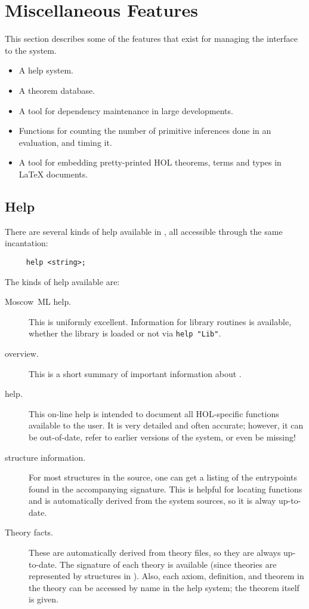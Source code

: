 \chapter{Miscellaneous Features}\label{avramisc}

This section describes some of the features
that exist for managing the interface
%
%
to the \HOL{} system.

\begin{itemize}
\item A help system.
\item A theorem database.
\item A tool for dependency maintenance in large developments.
\item Functions for counting the number of primitive inferences done in
an evaluation, and timing it.
\item A tool for embedding pretty-printed HOL theorems, terms and
  types in \LaTeX{} documents.
\end{itemize}

\section{Help}

 There are several kinds of help available in \HOL{}, all accessible
 through the same incantation:
 \begin{verbatim}
     help <string>;
 \end{verbatim}

 The kinds of help available are:

 \begin{description}

 \item [Moscow~ML help.] This is uniformly excellent. Information for
   library routines is available, whether the library is loaded or not
   via \verb+help "Lib"+.

\item [\HOL{} overview.] This is a short summary of important information
  about \HOL{}.

\item [\HOL{} help.] This on-line help is intended to document all
  HOL-specific functions available to the user. It is very detailed
  and often accurate; however, it can be out-of-date, refer to earlier
  versions of the system, or even be missing!

\item [\HOL{} structure information.]  For most structures in the
  \HOL{} source, one can get a listing of the entrypoints found in the
  accompanying signature. This is helpful for locating functions and
  is automatically derived from the system sources, so it is alway
  up-to-date.

\item [Theory facts.] These are automatically derived from theory
  files, so they are always up-to-date. The signature of each theory
  is available (since theories are represented by structures in
  \HOL{}). Also, each axiom, definition, and theorem in the theory can
  be accessed by name in the help system; the theorem itself is given.
\end{description}

